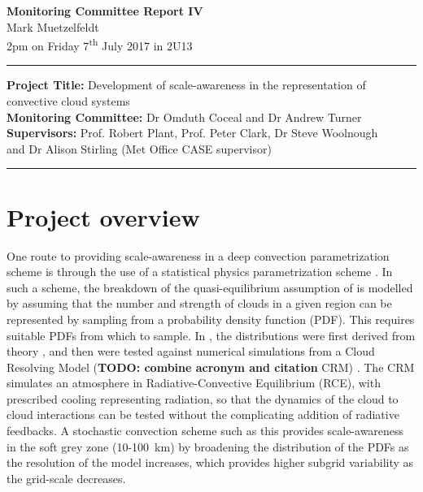 \documentclass[11pt,a4paper]{article}
\newcommand{\ts}{\textsuperscript}
\newcommand\todo[1]{\textbf{TODO: #1}}
\begin{document}

\begin{center}
    \Large{\textbf{Monitoring Committee Report IV}}\\[0.1cm]
    \large{Mark Muetzelfeldt}\\
    \normalsize{2pm on Friday 7\ts{th} July 2017 in 2U13}\\[0.1cm]		
    \rule{\textwidth}{0.2mm}
    \textbf{Project Title: }Development of scale-awareness in the representation of
    convective cloud systems\\
    \textbf{Monitoring Committee: }Dr Omduth Coceal and  Dr Andrew Turner\\
    \textbf{Supervisors: }Prof. Robert Plant, Prof. Peter Clark, Dr Steve Woolnough \\
    and Dr Alison Stirling (Met Office CASE supervisor)\\
    \rule{\textwidth}{0.2mm}
\end{center}

\section{Project overview}
\label{sec:Project Overview}

One route to providing scale-awareness in a deep convection parametrization scheme is through the use of a statistical physics parametrization scheme \parencite{plant2008stochastic}. In such a scheme, the breakdown of the quasi-equilibrium assumption of \cite{arakawa1974interaction} is modelled by assuming that the number and strength of clouds in a given region can be represented by sampling from a probability density function (PDF). This requires suitable PDFs from which to sample. In \cite{plant2008stochastic}, the distributions were first derived from theory \parencite{craig2006fluctuations}, and then were tested against numerical simulations from a Cloud Resolving Model (\todo{combine acronym and citation} CRM) \parencite{cohen2006fluctuations}. The CRM simulates an atmosphere in Radiative-Convective Equilibrium (RCE), with prescribed cooling representing radiation, so that the dynamics of the cloud to cloud interactions can be tested without the complicating addition of radiative feedbacks. A stochastic convection scheme such as this provides scale-awareness in the soft grey zone (\SI{10}{}-\SI{100}{km}) by broadening the distribution of the PDFs as the resolution of the model increases, which provides higher subgrid variability as the grid-scale decreases.
\end{document}
